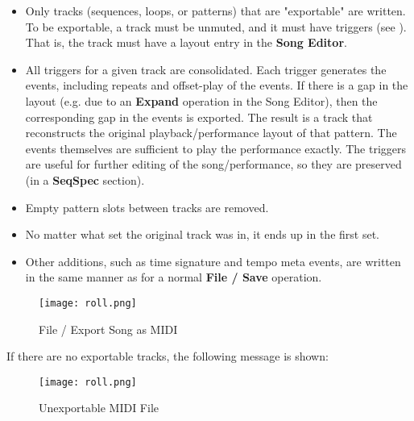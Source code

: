    \begin{itemize}
      \item Only tracks (sequences, loops, or patterns)
         that are "exportable" are written.  To be exportable, a
         track must be unmuted, and it must have triggers (see
         ).  That is,
         the track must have a layout entry in the \textbf{Song Editor}.
      \item All triggers for a given track are consolidated.
         Each trigger generates the events, including repeats and
         offset-play of the events.
         If there is a gap in the layout
         (e.g. due to an \textbf{Expand} operation in the Song Editor),
         then the corresponding gap in the events is exported.
         The result is a track that reconstructs the original
         playback/performance layout of that pattern.
         The events themselves are sufficient to play the performance exactly.
         The triggers are useful for further editing of the song/performance,
         so they are preserved (in a \textbf{SeqSpec} section).
      \item Empty pattern slots between tracks are removed.
      \item No matter what set the original track was in, it ends up in the
         first set.
      \item Other additions, such as time signature and tempo meta events, are
         written in the same manner as for a normal \textbf{File / Save}
         operation.
   \end{itemize}

\begin{figure}[H]
   \centering 
   \texttt{[image: roll.png]}
   \caption{File / Export Song as MIDI}
   \label{fig:midi_export_file_export}
\end{figure}

   If there are no exportable tracks, the following message is shown:

\begin{figure}[H]
   \centering 
   \texttt{[image: roll.png]}
   \caption{Unexportable MIDI File}
   \label{fig:midi_export_file_unexportable}
\end{figure}

